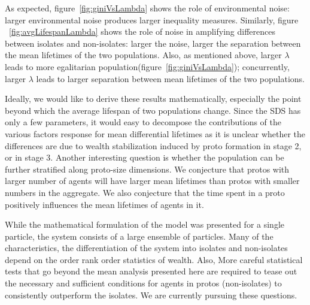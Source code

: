 As expected, figure~\ref{fig:giniVsLambda} shows the role of environmental noise: larger environmental noise produces larger inequality measures. Similarly, figure ~\ref{fig:avgLifespanLambda} shows the role of noise in amplifying differences between isolates and non-isolates: larger the noise, larger the separation between the mean lifetimes of the two populations. Also, as mentioned above, larger $\lambda$ leads to more egalitarian population(figure~\ref{fig:giniVsLambda}); concurrently, larger $\lambda$ leads to larger separation between mean lifetimes of the two populations. 

Ideally, we would like to derive these results mathematically, especially the point beyond which the average lifespan of two populations change. Since the SDS has only a few parameters, it would easy to decompose the contributions of the various factors response for mean differential lifetimes as it is unclear whether the differences are due to wealth stabilization induced by proto formation in stage 2, or in stage 3.  Another interesting question is whether the population can be further stratified along proto-size dimensions. We conjecture that protos with larger number of agents will have larger mean lifetimes than protos with smaller numbers in the aggregate. We also conjecture that the time spent in a proto positively influences the mean lifetimes of agents in it.  

While the mathematical formulation of the model was presented for a single particle, the system consists of a large ensemble of particles. Many of the characteristics, the differentiation of the system into isolates and non-isolates depend on the order rank order statistics of wealth. Also, More careful statistical tests that go beyond the mean analysis presented here are required to tease out the necessary and sufficient conditions for agents in protos (non-isolates) to consistently outperform the isolates. We are currently pursuing these questions. 

